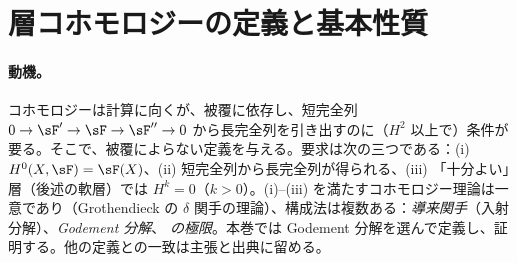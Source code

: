 \section{層コホモロジーの定義と基本性質}\label{sec:cohom}

\paragraph{動機。}\Cech{} コホモロジーは計算に向くが、被覆に依存し、短完全列 $0\to\sF'\to\sF\to\sF''\to0$ から長完全列を引き出すのに（$H^2$ 以上で）条件が要る。そこで、被覆によらない定義を与える。要求は次の三つである：(i) $H^0(X,\sF)=\sF(X)$、(ii) 短完全列から長完全列が得られる、(iii) 「十分よい」層（後述の軟層）では $H^k=0$（$k>0$）。(i)--(iii) を満たすコホモロジー理論は一意であり（Grothendieck の $\delta$ 関手の理論）、構成法は複数ある：\emph{導来関手}（入射分解）、\emph{Godement 分解}、\emph{\Cech{} の極限}。本巻では Godement 分解を選んで定義し、証明する。他の定義との一致は主張と出典に留める。

